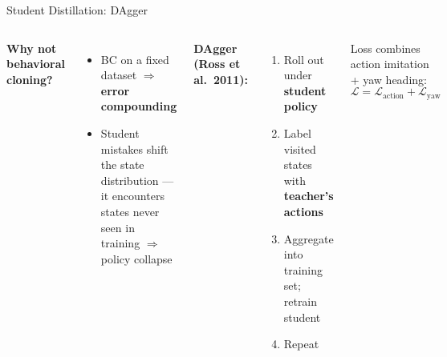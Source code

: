 \documentclass[aspectratio=169,10pt]{beamer}
\begin{document}
\begin{frame}{Student Distillation: DAgger}
\begin{columns}[T]
  \textbf{Why not behavioral cloning?}
  \begin{itemize}
    \item BC on a fixed dataset $\Rightarrow$ \textbf{error compounding}
    \item Student mistakes shift the state distribution --- it encounters
          states never seen in training $\Rightarrow$ policy collapse
  \end{itemize}

  \vspace{0.6em}
  \textbf{DAgger (Ross et al.\ 2011):}
  \begin{enumerate}
    \setlength\itemsep{0.3em}
    \item Roll out under \textbf{student policy}
    \item Label visited states with \textbf{teacher's actions}
    \item Aggregate into training set; retrain student
    \item Repeat
  \end{enumerate}

  \vspace{0.5em}
  Loss combines action imitation + yaw heading:
  \[ \mathcal{L} = \mathcal{L}_{\text{action}} + \mathcal{L}_{\text{yaw}} \]

\end{columns}
\end{frame}
\end{document}
